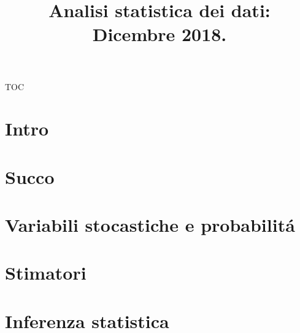 \documentclass[10pt,xcolor={usenames},fleqn,mathserif,serif]{beamer}
\title{Analisi statistica dei dati: Dicembre 2018.}
\begin{document}
\begin{frame}
  \titlepage
\end{frame}

\begin{frame}{TOC}

\tableofcontents[onlyparts]
\end{frame}

\part{Intro}


\part{Succo}


\part{Variabili stocastiche e probabilit\'a}


\part{Stimatori}

\part{Inferenza statistica}

\end{document}
